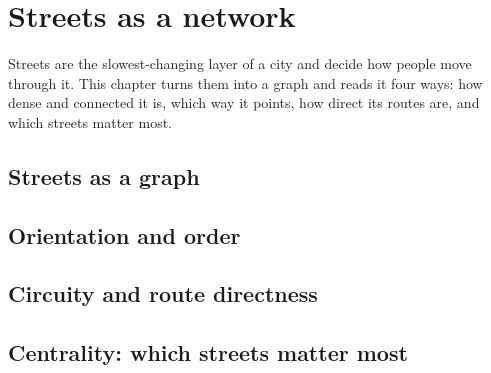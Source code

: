 \chapter{Streets as a network}\label{ch:streets}

Streets are the slowest-changing layer of a city and decide how people move through it. This chapter turns them into a graph and reads it four ways: how dense and connected it is, which way it points, how direct its routes are, and which streets matter most.

\section{Streets as a graph}

\section{Orientation and order}

\section{Circuity and route directness}

\section{Centrality: which streets matter most}


